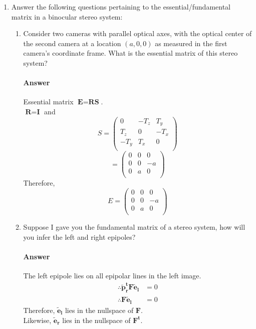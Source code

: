 \documentclass[11pt]{article}
\begin{document}
\maketitle

\begin{enumerate}
\item Answer the following questions pertaining to the essential/fundamental matrix in a binocular stereo system:
\begin{enumerate}
\item Consider two cameras with parallel optical axes, with the optical center of the second camera at a location $(a,0,0)$ as measured in the first camera's coordinate frame. What is the essential matrix of this stereo system?
\paragraph{Answer}
Essential matrix $\textbf{E} = \textbf{RS}$.\\
$\textbf{R} = \textbf{I}$ and \\
\[
S =
\begin{pmatrix}
    0 & -T_{z} & T_{y} \\
    T_{z} & 0 & - T_{x} \\
    - T_{y} & T_{x} & 0\\
\end{pmatrix}
\]
\[
 =
\begin{pmatrix}
    0 & 0 & 0 \\
    0 & 0 & -a \\
    0 & a & 0\\
\end{pmatrix}
\]
Therefore,
\[
E =
\begin{pmatrix}
    0 & 0 & 0 \\
    0 & 0 & -a \\
    0 & a & 0\\
\end{pmatrix}
\]

\item Suppose I gave you the fundamental matrix of a stereo system, how will you infer the left and right epipoles?
\paragraph{Answer}
The left epipole lies on all epipolar lines in the left image.
\begin{align*}
\therefore \mathbf{\widetilde{p}_r^tF\widetilde{e}_l} &= 0 \\
\therefore \mathbf{F\widetilde{e}_l} &= 0
\end{align*}
Therefore, $\mathbf{\widetilde{e}_l}$ lies in the nullspace of $\mathbf{F}$.\\
Likewise, $\mathbf{\widetilde{e}_r}$ lies in the nullspace of $\mathbf{F^t}$.\\


\end{enumerate}
\end{enumerate}
\end{document}
